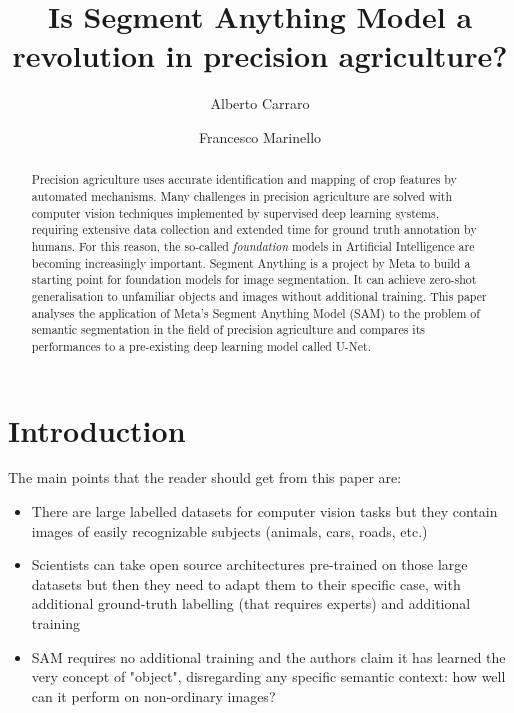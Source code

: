 \documentclass[runningheads]{llncs}
\begin{document}
%
\title{Is Segment Anything Model a revolution in precision agriculture?}
%
%


\author{
Alberto Carraro
\and
Francesco Marinello
}
%
%
\maketitle              %
%
\begin{abstract}
Precision agriculture uses accurate identification and mapping of crop features by automated mechanisms. Many challenges in precision agriculture are solved with computer vision techniques implemented by supervised deep learning systems, requiring extensive data collection and extended time for ground truth annotation by humans. For this reason, the so-called \emph{foundation} models in Artificial Intelligence are becoming increasingly important. Segment Anything is a project by Meta to build a starting point for foundation models for image segmentation. It can achieve zero-shot generalisation to unfamiliar objects and images without additional training. This paper analyses the application of Meta's Segment Anything Model (SAM) to the problem of semantic segmentation in the field of precision agriculture and compares its performances to a pre-existing deep learning model called U-Net. 
\end{abstract}

\section{Introduction}

{
\color{red} The main points that the reader should get from this paper are:
\begin{itemize}
\item There are large labelled datasets for computer vision tasks but they contain images of easily recognizable subjects (animals, cars, roads, etc.)
\item Scientists can take open source architectures pre-trained on those large datasets but then they need to adapt them to their specific case, with additional ground-truth labelling (that requires experts) and additional training
\item SAM requires no additional training and the authors claim it has learned the very concept of "object", disregarding any specific semantic context: how well can it perform on non-ordinary images?
\end{itemize}
}
\end{document}

